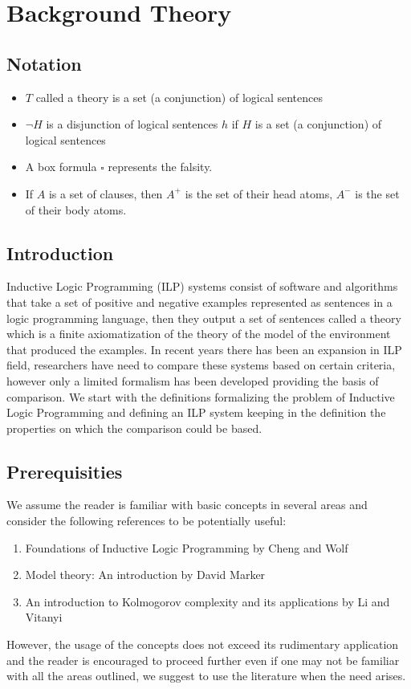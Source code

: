 
\chapter{Background Theory}


\section{Notation}
\begin{itemize}
\item $T$ called a theory is a set (a conjunction) of logical sentences
\item $\neg H$ is a disjunction of logical sentences $h$ if $H$ is a set (a conjunction) of logical sentences
\item A box formula $\square$ represents the falsity.
\item If $A$ is a set of clauses, then $A^+$ is the set of their head atoms, $A^-$ is the set of their body atoms.
\end{itemize}

\section{Introduction}
Inductive Logic Programming (ILP) systems consist of software and algorithms that take a set of positive and negative examples represented as sentences in a logic programming language, then they output a set of sentences called a theory which is a finite axiomatization of the theory of the model of the environment that produced the examples. In recent years there has been an expansion in ILP field, researchers have need to compare these systems based on certain criteria, however only a limited formalism has been developed providing the basis of comparison.
We start with the definitions formalizing the problem of Inductive Logic Programming and defining an ILP system keeping in the definition the properties on which the comparison could be based.

\section{Prerequisities}
We assume the reader is familiar with basic concepts in several areas and consider the following references to be potentially useful:
\begin{enumerate}
\item Foundations of Inductive Logic Programming by Cheng and Wolf \cite{cheng1997}
\item Model theory: An introduction by David Marker \cite{marker2002}
\item An introduction to Kolmogorov complexity and its applications by Li and Vitanyi \cite{li1997}
\end{enumerate}
However, the usage of the concepts does not exceed its rudimentary application and the reader is encouraged to proceed further even if one may not be familiar with all the areas outlined, we suggest to use the literature when the need arises.
